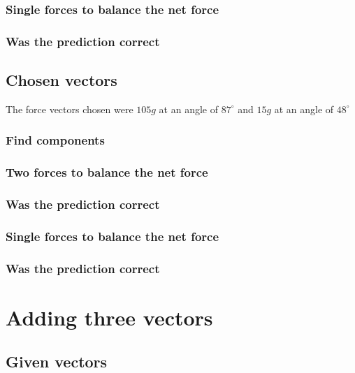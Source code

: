 \documentclass[11pt, letterpaper, includehead]{article}
\begin{document}
\subsubsection{Single forces to balance the net force} %

\subsubsection{Was the prediction correct} %

\subsection{Chosen vectors} %
The force vectors chosen were $105g$ at an angle of $87^{\circ}$ and $15g$ at an angle of $48^{\circ}$

\subsubsection{Find components} %

\subsubsection{Two forces to balance the net force} %

\subsubsection{Was the prediction correct} %

\subsubsection{Single forces to balance the net force} %

\subsubsection{Was the prediction correct} %

\section{Adding three vectors} %

\subsection{Given vectors} %
\end{document}
